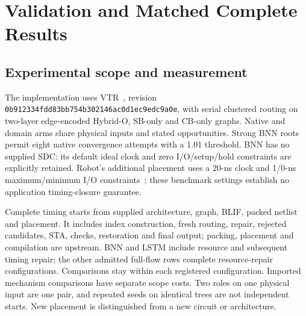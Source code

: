 \documentclass[conference,10pt]{IEEEtran}
\begin{document}
\section{Validation and Matched Complete Results}
\subsection{Experimental scope and measurement}
The implementation uses VTR~\cite{vtr9paper}, revision \texttt{0b912334fdd83bb754b302146ac0d1ec9edc9a0e}, with serial clustered routing on two-layer edge-encoded Hybrid-O, SB-only and CB-only graphs. Native and domain arms share physical inputs and stated opportunities. Strong BNN roots permit eight native convergence attempts with a 1.01 threshold. BNN has no supplied SDC: its default ideal clock and zero I/O/setup/hold constraints are explicitly retained. Robot's additional placement uses a 20-ns clock and 1/0-ns maximum/minimum I/O constraints~\cite{vprsdc}; these benchmark settings establish no application timing-closure guarantee.

Complete timing starts from supplied architecture, graph, BLIF, packed netlist and placement. It includes index construction, fresh routing, repair, rejected candidates, STA, checks, restoration and final output; packing, placement and compilation are upstream. BNN and LSTM include resource and subsequent timing repair; the other admitted full-flow rows complete resource-repair configurations. Comparisons stay within each registered configuration. Imported mechanism comparisons have separate scope costs. Two roles on one physical input are one pair, and repeated seeds on identical trees are not independent starts. New placement is distinguished from a new circuit or architecture.
\end{document}
